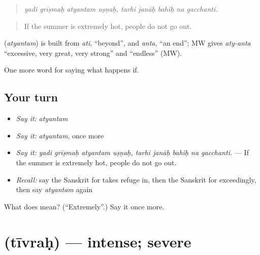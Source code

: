 \begin{quote}
\emph{yadi grīṣmaḥ atyantam uṣṇaḥ, tarhi janāḥ bahiḥ na gacchanti.}
\end{quote}

\begin{quote}
If the summer is extremely hot, people do not go out.
\end{quote}

\begin{cousinweb}
\textbf{} (\emph{atyantam}) is built from \emph{ati}, \textquotedblleft{}beyond\textquotedblright{}, and \emph{anta}, \textquotedblleft{}an end\textquotedblright{}; MW gives \emph{aty-anta} \textquotedblleft{}excessive, very great, very strong\textquotedblright{} and \textquotedblleft{}endless\textquotedblright{} (MW).
\end{cousinweb}

\begin{grammarlens}[title={What you've built}]
One more word for saying what happens if.
\end{grammarlens}

\subsection*{Your turn}
\begin{itemize}
\raggedright
  \item \emph{Say it:} \emph{atyantam}
  \item \emph{Say it:} \emph{atyantam}, once more
  \item \emph{Say it:} \emph{yadi grīṣmaḥ atyantam uṣṇaḥ, tarhi janāḥ bahiḥ na gacchanti.} — If the summer is extremely hot, people do not go out.
  \item \emph{Recall:} say the Sanskrit for takes refuge in, then the Sanskrit for exceedingly, then say \emph{atyantam} again
\end{itemize}

\begin{tcolorbox}[breakable,colback=teal!4,colframe=teal!35!black,title={Before you move on}]
What does  mean? (\textquotedblleft{}Extremely\textquotedblright{}.) Say it once more.
\end{tcolorbox}
\section[\texorpdfstring{\sk{तीव्रः} (tīvraḥ)}{तीव्रः (tīvraḥ)}]{ (tīvraḥ) — intense; severe}

